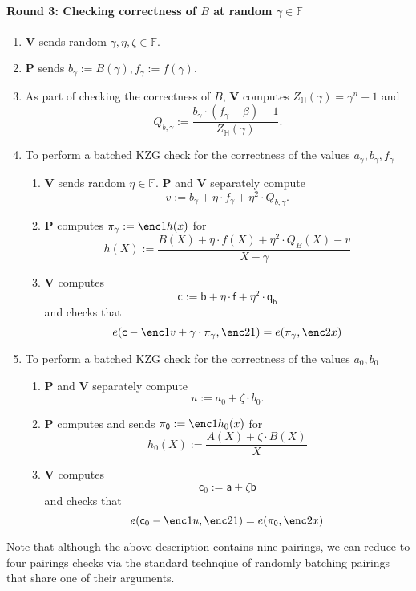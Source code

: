 \documentclass[11pt]{article} %
\newcommand{\F}{\ensuremath{\mathbb F}\xspace}
\newcommand{\defeq}{:=}
\newcommand{\prv}{\ensuremath{\mathsf{\mathbf{P}}}\xspace}
\newcommand{\ver}{\ensuremath{\mathsf{\mathbf{V}}}\xspace}
\newcommand{\subspace}{\ensuremath{\mathbb{H}}\xspace}
\newcommand{\witsize}{\ensuremath{n}\xspace}
\renewcommand{\a}{\ensuremath{\mathsf{a}}\xspace}
\renewcommand{\b}{\ensuremath{\mathsf{b}}\xspace}
\renewcommand{\c}{\ensuremath{\mathsf{c}}\xspace}
\newcommand{\f}{\ensuremath{\mathsf{f}}\xspace}
\newcommand{\qb}{\ensuremath{\mathsf{q_b}}\xspace}
\newcommand{\agam}{\ensuremath{a_\gamma}\xspace}
\newcommand{\gamproof}{\ensuremath{\mathsf{\pi_\gamma}}\xspace}
\newcommand{\zerproof}{\ensuremath{\mathsf{\pi_0}}\xspace}
\newcommand{\bgam}{\ensuremath{b_\gamma}\xspace}
\newcommand{\qbgam}{\ensuremath{Q_{b,\gamma}}\xspace}
\newcommand{\fgam}{\ensuremath{f_{\gamma}}\xspace}
\begin{document}
	\paragraph{\textbf{Round 3:} Checking correctness of  $B$ at random $\gamma \in \F$}
 \begin{enumerate}
\item \ver sends random $\gamma,\eta,\zeta \in \F$.
\item \prv sends $\bgam \defeq B(\gamma),\fgam \defeq f(\gamma)$.
\item\label{step:setQB} As part of checking the correctness of $B$, \ver computes $ Z_\subspace(\gamma) = \gamma^\witsize -1$ and
\[\qbgam\defeq \frac{\bgam\cdot (\fgam + \beta)-1}{Z_\subspace(\gamma)}.\]
\item To perform a batched KZG check for the correctness of the values  $\agam,\bgam,\fgam$
  \begin{enumerate}
   \item \ver sends random $\eta\in \F$. \prv and \ver separately compute
   \[v\defeq \bgam +\eta\cdot\fgam + \eta^2\cdot \qbgam.\]
   \item \prv computes $\gamproof\defeq \enc1{h(x)}$ for 
   \[h(X)\defeq \frac{ B(X)+ \eta\cdot f(X) + \eta^2\cdot Q_B(X) -v}{X-\gamma}\]
   \item\label{step:checkKZG1} \ver computes 
   \[\c\defeq \b+\eta\cdot \f +\eta^2\cdot \qb\]
   and  checks that 
   \[e(\c-\enc1{v}+\gamma\cdot \gamproof,\enc2{1})=e(\gamproof,\enc2{x})\]
  \end{enumerate}
\item To perform a batched KZG check for the correctness of the values  $a_0,b_0$
  \begin{enumerate}
   \item  \prv and \ver separately compute
   \[u\defeq a_0+\zeta \cdot b_0.\] 
   \item \prv computes and sends $\zerproof\defeq \enc1{h_0(x)}$ for 
   \[h_0(X)\defeq \frac{A(X)+\zeta\cdot B(X)}{X}\]
   \item\label{step:checkKZG2} \ver computes 
   \[\c_0 \defeq \a +\zeta \b\]
   and  checks that 
   \[e(\c_0-\enc1{u},\enc2{1})=e(\zerproof,\enc2{x})\]
  \end{enumerate}

\end{enumerate}

Note that although the above description contains nine pairings, we can reduce to four pairings checks via the standard technqiue of randomly batching
pairings that share one of their arguments.
                     
\end{document}
